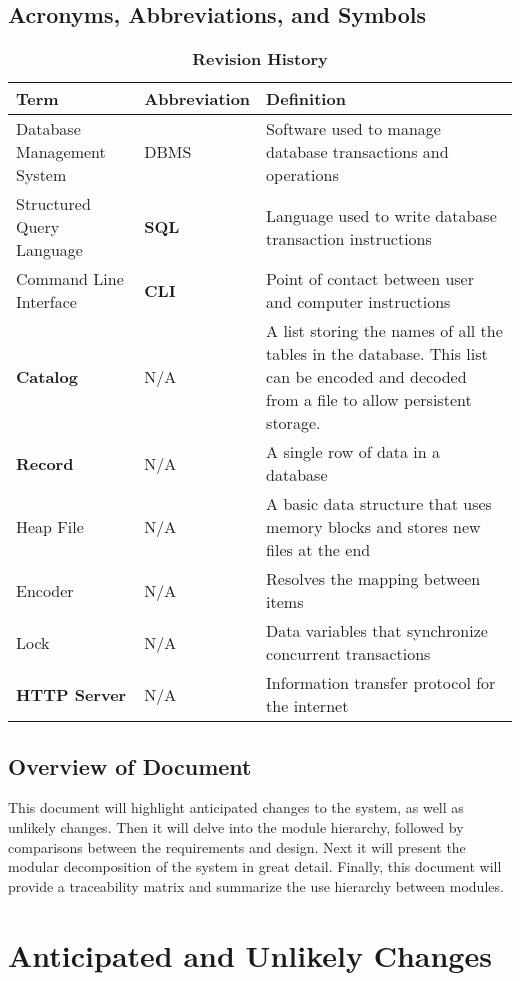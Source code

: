 \documentclass[12pt, titlepage]{article}
\begin{document}
\subsection{Acronyms, Abbreviations, and Symbols}
\begin{table}[H]
\caption{\bf Revision History}
\begin{tabularx}{\textwidth}{p{3cm}p{2cm}X}
\toprule {\bf Term} & {\bf Abbreviation} & {\bf Definition}\\
\midrule
Database Management System & DBMS & Software used to manage database transactions and operations\\
Structured Query Language & \textbf{SQL} & Language used to write database transaction instructions\\
Command Line Interface & \textbf{CLI} & Point of contact between user and computer instructions \\
\textbf{Catalog} & N/A & A list storing the names of all the tables in the database. This list can be encoded and decoded from a file to allow persistent storage.\\
\textbf{Record} & N/A & A single row of data in a database\\
Heap File & N/A & A basic data structure that uses memory blocks and stores new files at the end \\
Encoder & N/A & Resolves the mapping between items \\
Lock & N/A  & Data variables that synchronize concurrent transactions \\
\textbf{HTTP Server} & N/A & Information transfer protocol for the internet \\

\bottomrule
\end{tabularx}
\end{table}

\subsection{Overview of Document}
This document will highlight anticipated changes to the system, as well as unlikely changes. Then it will delve into the module hierarchy, followed by comparisons between the requirements and design. Next it will present the modular decomposition of the system in great detail. Finally, this document will provide a traceability matrix and summarize the use hierarchy between modules.
\section{Anticipated and Unlikely Changes} \label{SecChange}
\end{document}

